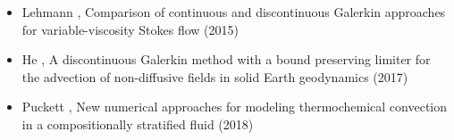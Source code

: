 \begin{itemize}
\item Lehmann \etal, Comparison of continuous and discontinuous Galerkin approaches
for variable-viscosity Stokes flow (2015) \cite{lelk15} 
\item He \etal, A discontinuous Galerkin method with a bound preserving limiter for
the advection of non-diffusive fields in solid Earth geodynamics (2017) \cite{hepb17}
\item Puckett \etal, New numerical approaches for modeling thermochemical convection in a
compositionally stratified fluid (2018) \cite{puth18}
\end{itemize}


